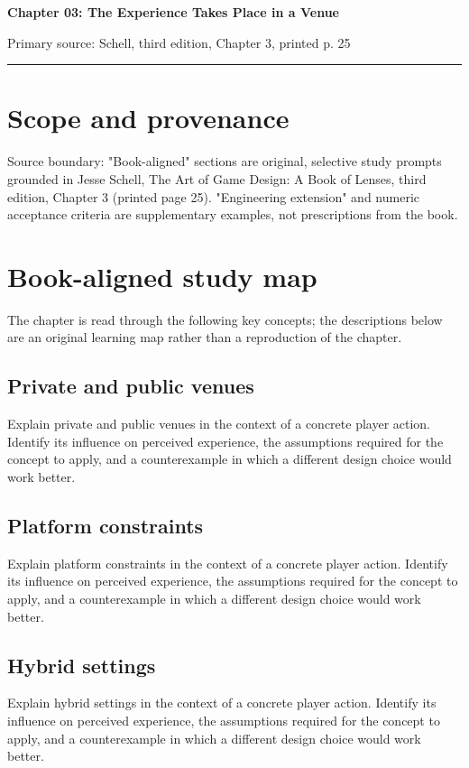 \documentclass[11pt]{article}
\begin{document}
{\huge\bfseries\color{suiteblue} Chapter 03: The Experience Takes Place in a Venue}\par
\vspace{0.15in}
{\normalsize\color{suitegray} Primary source: Schell, third edition, Chapter 3, printed p. 25}\par
\vspace{0.15in}\hrule\vspace{0.15in}

\section{Scope and provenance}
Source boundary: "Book-aligned" sections are original, selective study prompts grounded in Jesse Schell, The Art of Game Design: A Book of Lenses, third edition, Chapter 3 (printed page 25). "Engineering extension" and numeric acceptance criteria are supplementary examples, not prescriptions from the book.


\section{Book-aligned study map}
The chapter is read through the following key concepts; the descriptions below are an original learning map rather than a reproduction of the chapter.


\subsection{Private and public venues}
Explain private and public venues in the context of a concrete player action. Identify its influence on perceived experience, the assumptions required for the concept to apply, and a counterexample in which a different design choice would work better.


\subsection{Platform constraints}
Explain platform constraints in the context of a concrete player action. Identify its influence on perceived experience, the assumptions required for the concept to apply, and a counterexample in which a different design choice would work better.


\subsection{Hybrid settings}
Explain hybrid settings in the context of a concrete player action. Identify its influence on perceived experience, the assumptions required for the concept to apply, and a counterexample in which a different design choice would work better.
\end{document}

